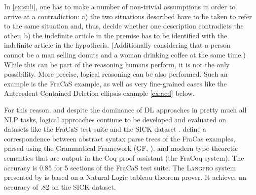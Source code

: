 \documentclass[11pt]{article}
\begin{document}
%
In \ref{ex:snli}, one has to make a number of non-trivial
assumptions in order to arrive at a contradiction: a) the two
situations described have to be taken to refer to the same situation
and, thus, decide whether one description contradicts the other, b)
the indefinite article in the premise has to be identified with the
indefinite article in the hypothesis. (Additionally considering that a
person cannot be a man selling donuts and a woman drinking coffee at
the same time.) While this can be part of the reasoning humans
perform, it is not the only possibility. More precise, logical
reasoning can be also performed. Such an example is the FraCaS
example, as well as very fine-grained cases like the Antecedent
Contained Deletion ellipsis example \ref{ex:acd} below.



For this reason, and despite the dominance of DL approaches in pretty
much all NLP tasks, logical approaches continue to be
developed and evaluated on datasets like the FraCaS test suite and the
SICK dataset \cite{marelli:2014}.  \citet{bernardy:2017} define a
correspondence between abstract syntax parse trees of the FraCas
examples, parsed using the Grammatical Framework (GF,
\citet{Ranta:GF}), and modern type-theoretic semantics that are output
in the Coq proof assistant (the FraCoq system).  The accuracy is 0.85
for 5 sections of the FraCaS test suite. The \textsc{Langpro} system
presented by \citet{Abzianidze:2015} is based on a Natural Logic
tableau theorem prover. It achieves an accuracy of .82 on the SICK
dataset.
\end{document}
